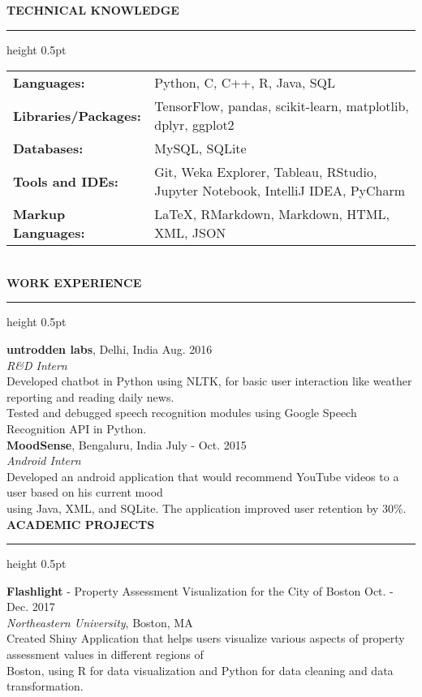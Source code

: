 \documentclass[a4paper]{article}
\newcommand{\myline}{\par
  \kern2pt %
  \hrule height 0.5pt
  \kern2pt %
}
\newcommand{\mybullet}{
	\indent \textbullet \hspace*{2mm}
}
\begin{document}
	\noindent
	{\large \textbf{TECHNICAL KNOWLEDGE}}
	\myline 
	
	\noindent
	\begin{tabular}{ m{3.5cm} l }
		\textbf{Languages: } & Python, C, C++, R, Java, SQL \\ 
		\textbf{Libraries/Packages: } & TensorFlow, pandas, scikit-learn, matplotlib,
                 dplyr, ggplot2 \\
		\textbf{Databases: } & MySQL, SQLite\\
		\textbf{Tools and IDEs: } & Git, Weka Explorer, Tableau, RStudio, 
                Jupyter Notebook, IntelliJ IDEA, PyCharm\\
		\textbf{Markup Languages: } & LaTeX, RMarkdown, Markdown, HTML, XML, JSON \\
	\end{tabular} \\

	\smallskip
	\smallskip
	\noindent
	{\large \textbf{WORK EXPERIENCE}}
	\myline 
	\smallskip
	
	\noindent
	\textbf{untrodden labs}, Delhi, India \hfill Aug. 2016 \\
        \textit{R\&D Intern}\\
        \mybullet Developed chatbot in Python using NLTK, for basic user interaction like 
        weather reporting and reading daily news. \\
	\mybullet Tested and debugged speech recognition modules using Google Speech 
        Recognition API in Python. \\
	
	\noindent
	\textbf{MoodSense}, Bengaluru, India \hfill July - Oct. 2015 \\
	\textit{Android Intern} \\
	\mybullet Developed an android application that would recommend YouTube videos to a 
        user based on his current mood \\
        \hspace*{9mm} using Java, XML, and SQLite. The 
        application improved user retention by 30\%. \\ 
	
        \noindent
	{\large \textbf{ACADEMIC PROJECTS}}
	\myline 
	\smallskip

        \noindent
        \textbf{Flashlight} - Property Assessment Visualization for the City of Boston 
        \hfill Oct. - Dec. 2017 \\
        \textit{Northeastern University}, Boston, MA \\
        \mybullet Created Shiny Application that helps users visualize various aspects of 
        property assessment values in different regions of \\ \hspace*{9mm} Boston, using 
        R for data visualization and Python for data cleaning and data transformation. \\
        
\end{document}
